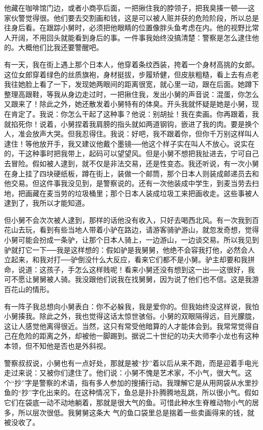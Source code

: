 他藏在咖啡馆门边，或者小商亭后面，一把揪住我的脖领子，把我臭揍一顿──这家伙警觉得很。他们要去交割画和钱，这是可以被人赃并获的危险阶段，所以总是往身后看。在跟踪小舅时，必须把他眼睛的位置像胖头鱼考虑在内。他的视野比常人开阔，不用回头就能看到身后的事。一件事我始终没搞清楚：警察是怎么逮住他的。大概他们比我还要警醒吧。 

有一天，我在街上遇上那个日本人，他穿着条纹西装，挎着一个身材高挑的女郎。这位女郎穿着绿色的丝质旗袍，身材挺拔，步履矫健，但皮肤粗糙，看上去有点老我往她脸上看了一下，发现她两眼间的距离很宽，就心里一动，跟在后面。她蹲下整理高跟鞋，等我从身边走过时，一把揪住我，发出小舅的声音说：混蛋，你怎么又跟来了！除此之外，她还散发着小舅特有的体臭。开头我就怀疑是她是小舅，现在肯定了。我说：你怎么干起了这种事？他说：别胡扯！我在卖画。你再跟着，我就掐死你！说着，小舅捏着我肩膀的指头就如两道钢钩，嵌进了我的肉。要是换个人，准会放声大哭。但我忍得住。我说：好吧，我不跟着你，但你千万别这样叫人逮住！等他放开手，我又建议他戴个墨镜──他这个样子实在叫人不放心。说实在的，干这种事时把我带上，起码可以望望风。但是小舅不想把我扯进去，宁可自己去冒险。假如被人逮到，就不仅是非法交易，还是性变态。我还听说，有一次小舅在身上挂了四块硬纸板，蹲在街上，装做一个邮筒，那个日本人则装成邮递员去和他交易。但这件事我没见到，是警察说的。还有一次他装成中学生，到麦当劳去扫地，把画藏在麦当劳的垃圾桶里；那个日本人装成垃圾工来把画收走。这些事被人逮到了，我所以才能知道。 

但小舅不会次次被人逮到，那样的话他没有收入，只好去喝西北风。有一次我到百花山去玩，看到有些当地人带着小驴在路边，请游客骑驴游山，就忽发奇想，觉得小舅可能会扮成一条驴，让那个日本人骑上，一边游山，一边谈交易。所以我见到驴就打它一下──我是这样想的：假如驴是我舅舅，他绝不会容我打他，必然会人立起来，和我对打──驴倒没什么大反应，看来它们都不是小舅。驴主却要和我拼命，说道：这孩子，手怎么这样贱呢！看来小舅还没有想到这一出──这很好，我可不愿让舅舅被人骑。我没跟他们说我在找舅舅，因为说了他们也不信。这是我游百花山的情形。 

有一阵子我总想向小舅表白：你不必躲我，我是爱你的。但我始终没这样说，我怕小舅揍我。除此之外，我也觉得这话太惊世骇俗。小舅的双眼隔得远，目光朦胧，这让人感觉他离得很近。当然，这只有常受他暗算的人才能体会到。我常常觉得自己在危险的距离之外，却被他一脚踢到。据说二十世纪的功夫大师李小龙也有这种本领，但不知他是否也是外斜视。 

警察叔叔说，小舅也有一点好处，那就是被“抄”着以后从来不跑，而是迎着手电光走过来说：又被你们逮住了。他们说：小舅不愧是艺术家，不小气，很大气。这个“抄”字是警察的术语，指有多人参加的搜捕行动。我理解它是从用网袋从水里抄鱼的“抄”字化出来的。在这种情况下，鱼总是扑扑腾腾地乱跳，所以很小气。假如它们在袋底一动不动地躺着，那就是很大气的鱼。可惜此种水生脊椎动物小气的居多，所以层次很低。我舅舅这条大 气的鱼口袋里总是揣着一些卖画得来的钱，就被没收了。 


